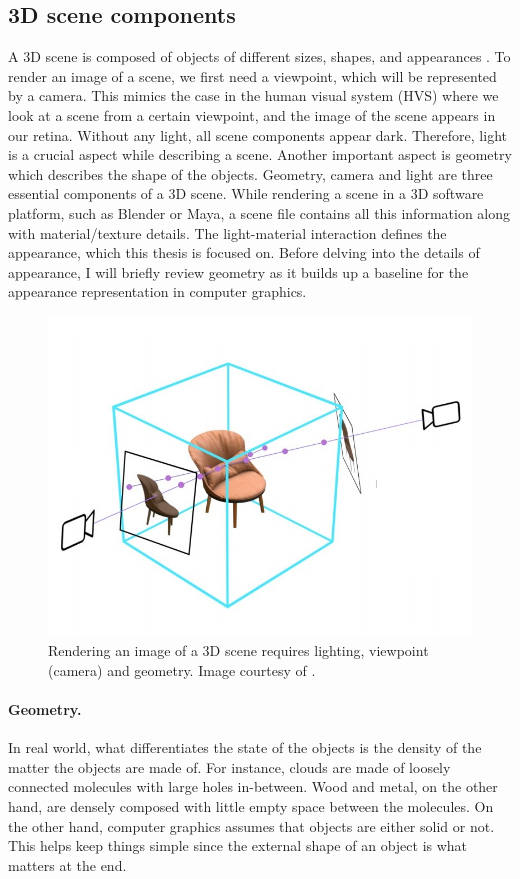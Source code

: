 \subsection{3D scene components}

A 3D scene is composed of objects of different sizes, shapes, and appearances . To render an image of a scene, we first need a viewpoint, which will be represented by a camera. This mimics the case in the human visual system (HVS) where we look at a scene from a certain viewpoint, and the image of the scene appears in our retina. Without any light, all scene components appear dark. Therefore, light is a crucial aspect while describing a scene. Another important aspect is geometry which describes the shape of the objects. Geometry, camera and light are three essential components of a 3D scene. While rendering a scene in a 3D software platform, such as Blender or Maya, a scene file contains all this information along with material/texture details. The light-material interaction defines the appearance, which this thesis is focused on. Before delving into the details of appearance, I will briefly review geometry as it builds up a baseline for the appearance representation in computer graphics.

\begin{figure}
  \centering
   \includegraphics[width=0.7\linewidth]{Images/scene_with_camera.jpg}
   \caption{Rendering an image of a 3D scene requires lighting, viewpoint (camera) and geometry. Image courtesy of \citeauthor{boss2021nerd} \cite{boss2021nerd}.}
   \label{fig:teaser}
\end{figure}


\paragraph{Geometry.} In real world, what differentiates the state of the objects is the density of the matter the objects are made of. For instance, clouds are made of loosely connected molecules with large holes in-between. Wood and metal, on the other hand, are densely composed with little empty space between the molecules. On the other hand, computer graphics assumes that objects are either solid or not. This helps keep things simple since the external shape of an object is what matters at the end. 



